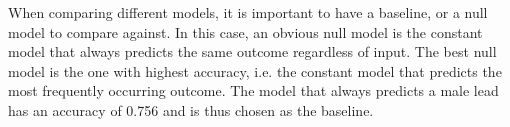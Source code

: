 \documentclass[../../project.tex]{subfiles}
\begin{document}
	When comparing different models, it is important to have a baseline, or a null model to compare against. In this case, an obvious null model is the constant model that always predicts the same outcome regardless of input. The best null model is the one with highest accuracy, i.e. the constant model that predicts the most frequently occurring outcome. The model that always predicts a male lead has an accuracy of 0.756 and is thus chosen as the baseline.
\end{document}
